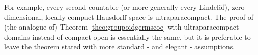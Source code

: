 For example, every second-countable (or more generally every Lindelöf), zero-dimensional, locally compact Hausdorff space is ultraparacompact. The proof of (the analogue of) Theorem \ref{theo:groupoidgermscoe} with ultraparacompact domains instead of compact-open is essentially the same, but it is preferable to leave the theorem stated with more standard - and elegant - assumptions.

